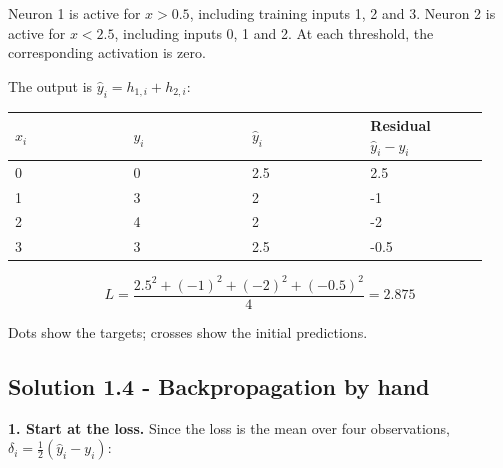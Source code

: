 \documentclass{course_sheet}
\begin{document}
Neuron 1 is active for $x>0.5$, including training inputs 1, 2 and 3.
Neuron 2 is active for $x<2.5$, including inputs 0, 1 and 2. At each
threshold, the corresponding activation is zero.

The output is $\hat y_i=h_{1,i}+h_{2,i}$:

\begin{center}

\begingroup
\setlength{\tabcolsep}{3pt}
\begin{tabular}{@{}p{0.234\linewidth}p{0.234\linewidth}p{0.234\linewidth}p{0.234\linewidth}@{}}
\toprule
$x_i$ & $y_i$ & $\hat y_i$ & Residual $\hat y_i-y_i$ \\
\midrule
0 & 0 & 2.5 & 2.5 \\
1 & 3 & 2 & -1 \\
2 & 4 & 2 & -2 \\
3 & 3 & 2.5 & -0.5 \\
\bottomrule
\end{tabular}
\endgroup

\end{center}

\begin{equation*}
L=\frac{2.5^2+(-1)^2+(-2)^2+(-0.5)^2}{4}=2.875
\end{equation*}

Dots show the targets; crosses show the initial predictions.

\begin{center}


\end{center}

\subsection{Solution 1.4 - Backpropagation by hand}

\textbf{1. Start at the loss.} Since the loss is the mean over four
observations, $\delta_i=\frac12(\hat y_i-y_i)$:
\end{document}
